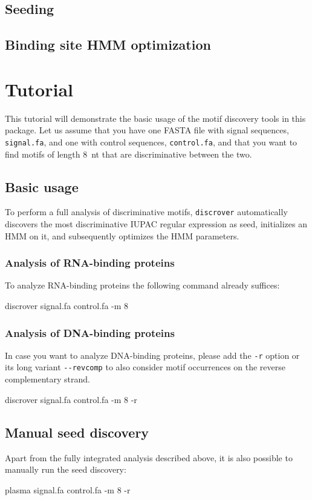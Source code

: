 \documentclass[a4paper]{article}
\newcommand{\discrover}[0]{\texttt{discrover}}
\begin{document}
\subsection{Seeding}
\subsection{Binding site HMM optimization}

\section{Tutorial}
This tutorial will demonstrate the basic usage of the motif discovery tools in this package.
Let us assume that you have one FASTA file with signal sequences, \verb|signal.fa|, and one with control sequences, \verb|control.fa|, and that you want to find motifs of length 8~nt that are discriminative between the two.
\subsection{Basic usage}
To perform a full analysis of discriminative motifs, \discrover{} automatically discovers the most discriminative IUPAC regular expression as seed, initializes an HMM on it, and subsequently optimizes the HMM parameters.
\subsubsection{Analysis of RNA-binding proteins}
To analyze RNA-binding proteins the following command already suffices:\\
\begin{verbbox}
discrover signal.fa control.fa -m 8
\end{verbbox}
\fbox{\theverbbox[t]}

\subsubsection{Analysis of DNA-binding proteins}
In case you want to analyze DNA-binding proteins, please add the \verb|-r| option or its long variant \verb|--revcomp| to also consider motif occurrences on the reverse complementary strand.\\
\begin{verbbox}
discrover signal.fa control.fa -m 8 -r
\end{verbbox}
\fbox{\theverbbox[t]}

\subsection{Manual seed discovery}
\label{tutorial:plasma}
Apart from the fully integrated analysis described above, it is also possible to manually run the seed discovery:\\
\begin{verbbox}
plasma signal.fa control.fa -m 8 -r
\end{verbbox}
\fbox{\theverbbox[t]}
\end{document}
